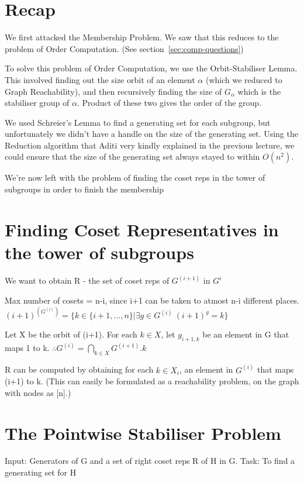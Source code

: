
\section{Recap}
We first attacked the Membership Problem. We saw that this reduces to the
problem of Order Computation. (See section~\ref{sec:comp-questions}) 

To solve this problem of Order Computation, we use the
Orbit-Stabiliser Lemma. This involved finding out the size orbit of an element
$\alpha$ (which we reduced to Graph Reachability), and then recursively
finding the size of $G_\alpha$ which is the stabiliser group of $\alpha$.
Product of these two gives the order of the group.

We used Schreier's Lemma to find a generating set for each subgroup, but
unfortunately we didn't have a handle on the size of the generating set. Using
the Reduction algorithm that Aditi very kindly explained in the previous
lecture, we could ensure that the size of the generating set always stayed to
within $O(n^2)$.

We're now left with the problem of finding the coset reps in the tower of subgroups in order to finish the membership 

\section{Finding Coset Representatives in the tower of subgroups}
We want to obtain R - the set of coset reps of $G^{(i+1)}$  in $G^i$

Max number of cosets = n-i, since i+1 can be taken to atmost n-i different places.\newline
$(i+1)^{(G^{(i)})}=\{ k \in \{i+1, . . ., n\} | \exists g \in G^{(i)} \: (i+1)^g = k\} $

Let X be the orbit of (i+1). For each $k \in X$, let $g_{i+1, k}$ be an element in G that maps 1 to k.\newline
$\therefore G^{(i)} = \bigcap_{k \in X} G^{(i+1)} .k$

R can be computed by obtaining for each $k \in X_i$, an element in $G^{(i)}$  that maps (i+1) to k. (This can easily be formulated as a reachability problem, on the graph with nodes as [n].)

\section{The Pointwise Stabiliser Problem}
Input: Generators of G and a set of right coset reps R of H in G.\newline
Task: To find a generating set for H\newline




